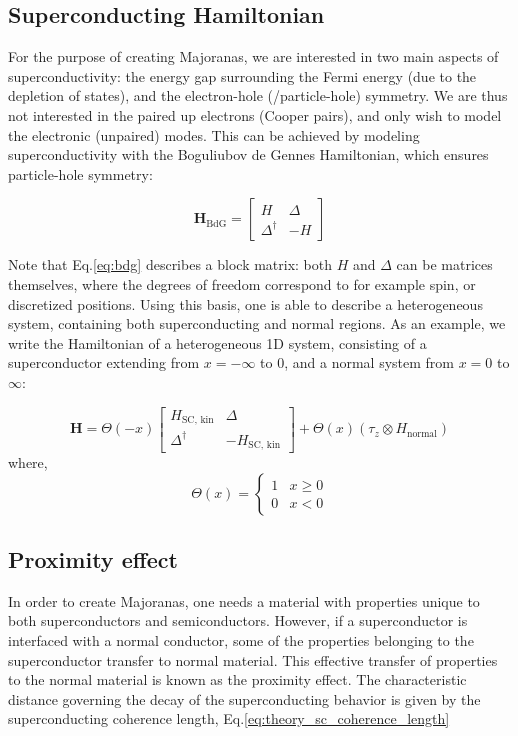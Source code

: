 	\subsection{Superconducting Hamiltonian}
		For the purpose of creating Majoranas, we are interested in two main aspects of superconductivity: the energy gap surrounding the Fermi energy (due to the depletion of states), and the electron-hole (/particle-hole) symmetry.
		We are thus not interested in the paired up electrons (Cooper pairs), and only wish to model the electronic (unpaired) modes.
		This can be achieved by modeling superconductivity with the Boguliubov de Gennes Hamiltonian, which ensures particle-hole symmetry:
		
		\begin{equation}
		\mathbf{H}_\text{BdG} = \begin{bmatrix} H & \Delta \\ \Delta^\dagger & -H \end{bmatrix}
		\label{eq:bdg}
		\end{equation}

		Note that Eq.\eqref{eq:bdg} describes a block matrix: both $H$ and $\Delta$ can be matrices themselves, where the degrees of freedom correspond to for example spin, or discretized positions.
		Using this basis, one is able to describe a heterogeneous system, containing both superconducting and normal regions.
		As an example, we write the Hamiltonian of a heterogeneous 1D system, consisting of a superconductor extending from $x = -\infty$ to $0$, and a normal system from  $x = 0$ to $\infty$:

		\begin{equation}
			\mathbf{H} =  \Theta \left(-x\right) \begin{bmatrix} H_\text{SC, kin} & \Delta \\ \Delta^\dagger & -H_\text{SC, kin} \end{bmatrix} + \Theta \left(x\right)  \left( \tau_z \otimes H_\text{normal} \right) 
			\end{equation}
		where, 
		\begin{equation}
			\Theta(x) = \begin{cases} 1 & x \geq 0 \\ 0 & x < 0 \end{cases}
		\end{equation}


	\subsection{Proximity effect}
		In order to create Majoranas, one needs a material with properties unique to both superconductors and semiconductors.
		However, if a superconductor is interfaced with a normal conductor, some of the properties belonging to the superconductor transfer to normal material.
		This effective transfer of properties to the normal material is known as the proximity effect.
		The characteristic distance governing the decay of the superconducting behavior is given by the superconducting coherence length, Eq.\eqref{eq:theory_sc_coherence_length}
		
